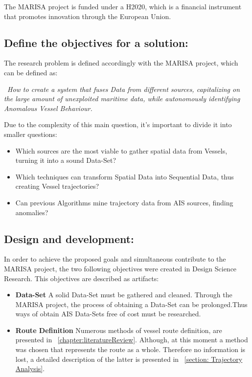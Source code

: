 The MARISA project is funded under a H2020, which is a financial instrument that promotes innovation through the European Union.

\subsection{Define the objectives for a solution:}
The research problem is defined accordingly with the MARISA project, which can be defined as: 

~\textit{How to create a system that fuses Data from different sources, capitalizing on the large amount of unexploited maritime data, while autonomously identifying Anomalous Vessel Behaviour.}  

Due to the complexity of this main question, it's important to divide it into smaller questions:

\begin{itemize}
\item Which sources are the most viable to gather spatial data from Vessels,
turning it into a sound Data-Set?
\item Which techniques can transform Spatial Data into Sequential Data, thus creating Vessel trajectories?
\item Can previous Algorithms mine trajectory data from AIS sources, finding anomalies?
\end{itemize}

\subsection{Design and development:} In order to achieve the proposed goals and simultaneous contribute to the MARISA project, the two following objectives were created in Design Science Research. This objectives are described as artifacts:

\begin{itemize}
\item \textbf{Data-Set} A solid Data-Set must be gathered and cleaned. Through the MARISA project, the process of obtaining a Data-Set can be prolonged.Thus ways of obtain AIS Data-Sets free of cost must be researched.

\item \textbf{Route Definition} Numerous methods of vessel route definition, are presented in ~\ref{chapter:literatureReview}.
Although, at this moment a method was chosen that represents the route as a whole. Therefore no information is lost, a detailed description of the latter is presented in ~\ref{section: Trajectory Analysis}.
\end{itemize}

